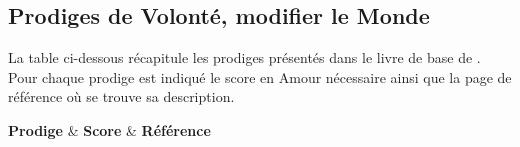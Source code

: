     \subsection{Prodiges de Volonté, modifier le Monde}\label{subsec:prodigesvolonte}
    La table ci-dessous récapitule les prodiges présentés dans le livre de base de . Pour chaque prodige est indiqué le score en Amour nécessaire ainsi que la page de référence où se trouve sa description.
    \begin{center} 
\tablehead
	{\hline \textbf{Prodige} & \textbf{Score} & \textbf{Référence}\\ \hline}
\tabletail
	{\hline {}\\}
\tablelasttail
	{\hline}
\begin{supertabular}{|c|c|c|}


\end{supertabular}
\end{center}
